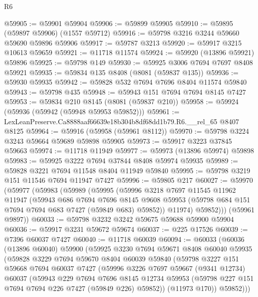 \begin{lexlean}{R6}
\begin{coremodule}
@59905 := @59901 @59904
@59906 := @59899 @59905
@59910 := @59895 (@59897 @59906) (@1557 @59712)
@59916 := @59798 @3216 @3244 @59660 @59690 @59896 @59906
@59917 := @59787 @3213
@59920 := @59917 @3215 @10613 @59659
@59921 := @11718 @11574
@59924 := @59920 (@13896 @59921) @59896
@59925 := @59798 @149
@59930 := @59925 @3006 @7694 @7697 @8408 @59921
@59935 := @59834 @135 @8408 (@8081 (@59837 @135))
@59936 := @59930 @59935
@59942 := @59828 @532 @7694 @7696 @8404 @11574 @59840
@59943 := @59798 @435
@59948 := @59943 @151 @7694 @7694 @8145 @7427
@59953 := @59834 @210 @8145 (@8081 (@59837 @210))
@59958 := @59924 (@59936 (@59942 (@59948 @59953 @59852)))
@59961 := LexLeanPreserve.Ca8888aaf66639e18b304b8df68dd1b79.R6.__rel_65 @8407 @8125
@59964 := @59916 (@59958 (@59961 @8112))
@59970 := @59798 @3224 @3243 @59664 @59689 @59898 @59905
@59973 := @59917 @3223 @37845 @59663
@59974 := @11718 @11949
@59977 := @59973 (@13896 @59974) @59898
@59983 := @59925 @3222 @7694 @37844 @8408 @59974 @59935
@59989 := @59828 @3221 @7694 @11548 @8404 @11949 @59840
@59995 := @59798 @3219 @151 @11546 @7694 @11947 @7427
@59996 := @59805 @217
@60027 := @59970
    (@59977
      (@59983
        (@59989
          (@59995
            (@59996
              @3218
              @7697
              @11545
              @11962
              @11947
              (@59943
                @686
                @7694
                @7696
                @8145
                @9608
                @59953
                (@59798 @684 @151 @7694 @7694 @683 @7427 (@59849 @683) @59852))
              @11974)
            @59852)))
      (@59961 @9897))
@60033 := @59798 @3232 @3242 @59675 @59688 @59900 @59904
@60036 := @59917 @3231 @59672 @59674
@60037 := @225 @17526
@60039 := @7396 @60037 @7427
@60040 := @11718 @60039
@60094 := @60033
    (@60036
      (@13896 @60040)
      @59900
      (@59925
        @3230
        @7694
        @59671
        @8408
        @60040
        @59935
        (@59828
          @3229
          @7694
          @59670
          @8404
          @60039
          @59840
          (@59798
            @3227
            @151
            @59668
            @7694
            @60037
            @7427
            (@59996
              @3226
              @7697
              @59667
              (@9341 @12734)
              @60037
              (@59943
                @229
                @7694
                @7696
                @8145
                @12734
                @59953
                (@59798 @227 @151 @7694 @7694 @226 @7427 (@59849 @226) @59852))
              (@11973 @170))
            @59852)))

\end{coremodule}
\end{lexlean}
